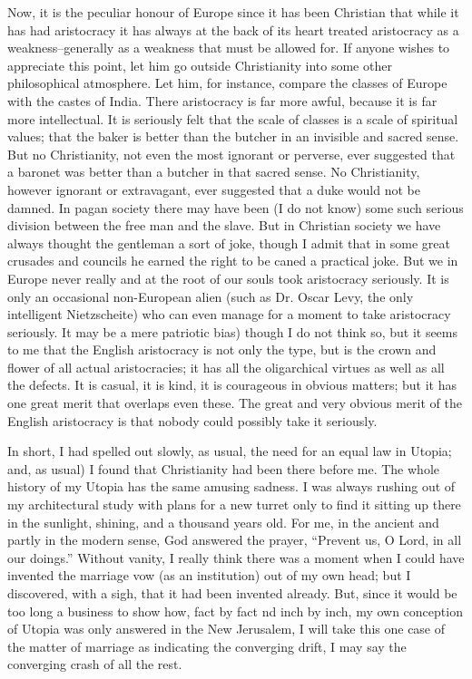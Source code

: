 \documentclass{book}
\begin{document}
Now, it is the peculiar honour of Europe since it has been Christian that while it has had aristocracy it has always at the back of its heart treated aristocracy as a weakness–generally as a weakness that must be allowed for. If anyone wishes to appreciate this point, let him go outside Christianity into some other philosophical atmosphere. Let him, for instance, compare the classes of Europe with the castes of India. There aristocracy is far more awful, because it is far more intellectual. It is seriously felt that the scale of classes is a scale of spiritual values; that the baker is better than the butcher in an invisible and sacred sense. But no Christianity, not even the most ignorant or perverse, ever suggested that a baronet was better than a butcher in that sacred sense. No Christianity, however ignorant or extravagant, ever suggested that a duke would not be damned. In pagan society there may have been (I do not know) some such serious division between the free man and the slave. But in Christian society we have always thought the gentleman a sort of joke, though I admit that in some great crusades and councils he earned the right to be caned a practical joke. But we in Europe never really and at the root of our souls took aristocracy seriously. It is only an occasional non-European alien (such as Dr. Oscar Levy, the only intelligent Nietzscheite) who can even manage for a moment to take aristocracy seriously. It may be a mere patriotic bias) though I do not think so, but it seems to me that the English aristocracy is not only the type, but is the crown and flower of all actual aristocracies; it has all the oligarchical virtues as well as all the defects. It is casual, it is kind, it is courageous in obvious matters; but it has one great merit that overlaps even these. The great and very obvious merit of the English aristocracy is that nobody could possibly take it seriously.

In short, I had spelled out slowly, as usual, the need for an equal law in Utopia; and, as usual) I found that Christianity had been there before me. The whole history of my Utopia has the same amusing sadness. I was always rushing out of my architectural study with plans for a new turret only to find it sitting up there in the sunlight, shining, and a thousand years old. For me, in the ancient and partly in the modern sense, God answered the prayer, “Prevent us, O Lord, in all our doings.” Without vanity, I really think there was a moment when I could have invented the marriage vow (as an institution) out of my own head; but I discovered, with a sigh, that it had been invented already. But, since it would be too long a business to show how, fact by fact nd inch by inch, my own conception of Utopia was only answered in the New Jerusalem, I will take this one case of the matter of marriage as indicating the converging drift, I may say the converging crash of all the rest.
\end{document}
